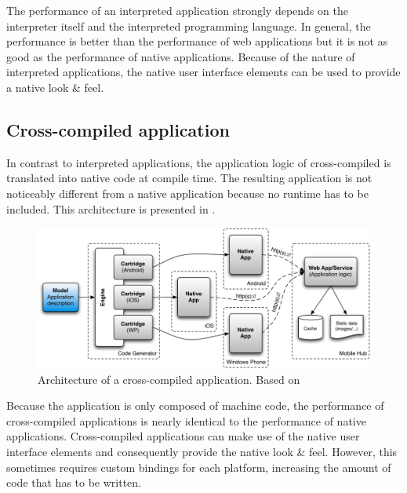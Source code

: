 The performance of an interpreted application strongly depends on the interpreter itself and the interpreted programming language. In general, the performance is better than the performance of web applications but it is not as good as the performance of native applications. Because of the nature of interpreted applications, the native user interface elements can be used to provide a native look \& feel.


\subsection{Cross-compiled application}

In contrast to interpreted applications, the application logic of cross-compiled is translated into native code at compile time. The resulting application is not noticeably different from a native application because no runtime has to be included. This architecture is presented in . 

\begin{figure}[h]
    \begin{center}
        \includegraphics[width=\textwidth]{../resources/figs/crosscompiled.pdf}
        \caption{Architecture of a cross-compiled application. Based on \cite{Friese}}
        \label{fig:crosscompiled}
    \end{center}
\end{figure} 

Because the application is only composed of machine code, the performance of cross-compiled applications is nearly identical to the performance of native applications. Cross-compiled applications can make use of the native user interface elements and consequently provide the native look \& feel. However, this sometimes requires custom bindings for each platform, increasing the amount of code that has to be written. 

